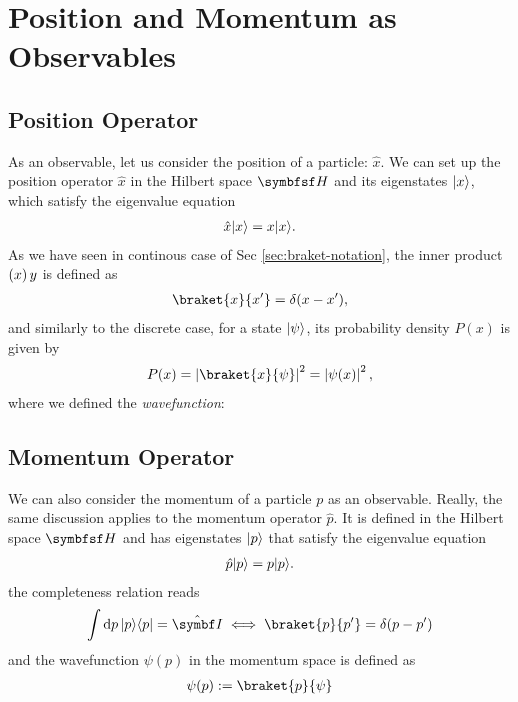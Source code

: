 \section{Position and Momentum as Observables}
\subsection{Position Operator}
As an observable, let us consider the position of a particle: $\hat{x}$.
We can set up the position operator $\hat{x}$ in the Hilbert space $\hilbert$ and its eigenstates $\lvert x\rangle$, which satisfy the eigenvalue equation
\begin{align}
  \hat{x} \lvert x\rangle = x \lvert x\rangle.
\end{align}
As we have seen in continous case of Sec \ref{sec:braket-notation}, the inner product $\left\lparen x \right\rparen{y}$ is defined as
\begin{align}
  \braket{x}{x^\prime} = \delta(x - x^\prime),
\end{align}
and similarly to the discrete case, for a state $\lvert\psi\rangle$, its probability density $P(x)$ is given by
\begin{align}
  P(x) = \abs{\braket{x}{\psi}}^2 = \abs{\psi(x)}^2,
\end{align}
where we defined the \emph{wavefunction}:

\subsection{Momentum Operator}
We can also consider the momentum of a particle $p$ as an observable.
Really, the same discussion applies to the momentum operator $\hat{p}$.
It is defined in the Hilbert space $\hilbert$ and has eigenstates $\lvert p\rangle$ that satisfy the eigenvalue equation
\begin{align}
  \hat{p} \lvert p\rangle = p \lvert p\rangle.
\end{align}
the completeness relation reads
\begin{align}
  \int \odif{p} \, \ket{p} \bra{p} = \idty \iff \braket{p}{p^\prime} = \delta(p - p^\prime)
\end{align}
and the wavefunction $\psi(p)$ in the momentum space is defined as
\begin{align}
  \psi(p) := \braket{p}{\psi}
\end{align}
